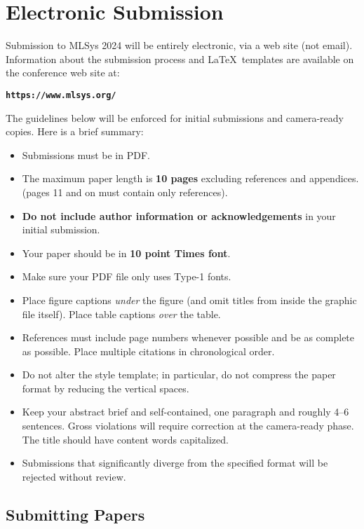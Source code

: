 \documentclass{article}
\begin{document}
\fi

\newpage

\iffalse
\section{Electronic Submission}
\label{submission}

Submission to MLSys 2024 will be entirely electronic, via a web site
(not email). Information about the submission process and \LaTeX\ templates
are available on the conference web site at:
\begin{center}
\textbf{\texttt{https://www.mlsys.org/}}
\end{center}

The guidelines below will be enforced for initial submissions and
camera-ready copies. Here is a brief summary:
\begin{itemize}
\item Submissions must be in PDF\@.
\item The maximum paper length is \textbf{10 pages} excluding references and appendices.
    (pages 11 and on must contain only references).
\item \textbf{Do not include author information or acknowledgements} in your
    initial submission.
\item Your paper should be in \textbf{10 point Times font}.
\item Make sure your PDF file only uses Type-1 fonts.
\item Place figure captions \emph{under} the figure (and omit titles from inside
    the graphic file itself). Place table captions \emph{over} the table.
\item References must include page numbers whenever possible and be as complete
    as possible. Place multiple citations in chronological order.
\item Do not alter the style template; in particular, do not compress the paper
    format by reducing the vertical spaces.
\item Keep your abstract brief and self-contained, one paragraph and roughly
    4--6 sentences. Gross violations will require correction at the
    camera-ready phase. The title should have content words capitalized.
\item Submissions that significantly diverge from the specified format
    will be rejected without review.
\end{itemize}

\subsection{Submitting Papers}
\end{document}
